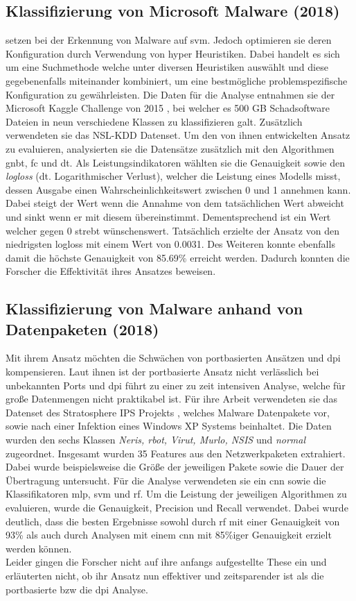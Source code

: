 \documentclass[
    12pt, %
    DIV10,
    ngerman, %
    a4paper, %
    oneside, %
    titlepage, %
    parskip=half, %
    headings=normal, %
    listof=totoc, %
    bibliography=totoc, %
    index=totoc, %
    captions=tableheading, %
    final %
]{scrreprt}
\begin{document}
\subsection{Klassifizierung von Microsoft Malware (2018)}
\textcite{Sabar2018} setzen bei der Erkennung von Malware auf \ac{svm}. Jedoch optimieren sie deren Konfiguration durch Verwendung von hyper Heuristiken. Dabei handelt es sich um eine Suchmethode welche unter diversen Heuristiken auswählt und diese gegebenenfalls miteinander kombiniert, um eine bestmögliche problemspezifische Konfiguration zu gewährleisten. Die Daten für die Analyse entnahmen sie der Microsoft Kaggle Challenge von 2015 \parencite{Kaggle}, bei welcher es 500 GB Schadsoftware Dateien in neun verschiedene Klassen zu klassifizieren galt. Zusätzlich verwendeten sie das NSL-KDD Datenset. Um den von ihnen entwickelten Ansatz zu evaluieren, analysierten sie die Datensätze zusätzlich mit den Algorithmen \ac{gnbt}, \ac{fc} und \ac{dt}. Als Leistungsindikatoren wählten sie die Genauigkeit sowie den \emph{logloss} (dt. Logarithmischer Verlust), welcher die Leistung eines Modells misst, dessen Ausgabe einen Wahrscheinlichkeitswert zwischen 0 und 1 annehmen kann. Dabei steigt der Wert wenn die Annahme von dem tatsächlichen Wert abweicht und sinkt wenn er mit diesem übereinstimmt. Dementsprechend ist ein Wert welcher gegen 0 strebt wünschenswert. Tatsächlich erzielte der Ansatz von \textcite{Sabar2018} den niedrigsten logloss mit einem Wert von 0.0031. Des Weiteren konnte ebenfalls damit die höchste Genauigkeit von 85.69\% erreicht werden. Dadurch konnten die Forscher die Effektivität ihres Ansatzes beweisen.
%
\subsection{Klassifizierung von Malware anhand von Datenpaketen (2018)}
Mit ihrem Ansatz möchten \textcite{Yeo2018} die Schwächen von portbasierten Ansätzen und \ac{dpi} kompensieren. Laut ihnen ist der portbasierte Ansatz nicht verlässlich bei unbekannten Ports und \ac{dpi} \parencite{dharmapurikar2003deep} führt zu einer zu zeit intensiven Analyse, welche für große Datenmengen nicht praktikabel ist. Für ihre Arbeit verwendeten sie das Datenset des Stratosphere IPS Projekts \parencite{garcia2014empirical}, welches Malware Datenpakete vor, sowie nach einer Infektion eines Windows XP Systems beinhaltet. Die Daten wurden den sechs Klassen \emph{Neris, rbot, Virut, Murlo, NSIS} und \emph{normal} zugeordnet. Insgesamt wurden 35 Features aus den Netzwerkpaketen extrahiert. Dabei wurde beispielsweise die Größe der jeweiligen Pakete sowie die Dauer der Übertragung untersucht. Für die Analyse verwendeten sie ein \ac{cnn} sowie die Klassifikatoren \ac{mlp}, \ac{svm} und \ac{rf}. Um die Leistung der jeweiligen Algorithmen zu evaluieren, wurde die Genauigkeit, Precision und Recall verwendet. Dabei wurde deutlich, dass die besten Ergebnisse sowohl durch \ac{rf} mit einer Genauigkeit von 93\% als auch durch Analysen mit einem \ac{cnn} mit 85\%iger Genauigkeit erzielt werden können. \\
Leider gingen die Forscher nicht auf ihre anfangs aufgestellte These ein und erläuterten nicht, ob ihr Ansatz nun effektiver und zeitsparender ist als die portbasierte bzw die \ac{dpi} Analyse.
%
\end{document}
